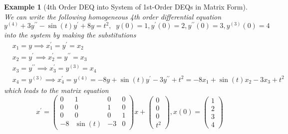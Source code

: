 \documentclass{article}
\newtheorem{example}{Example}[section]
\theoremstyle{remark}
\theoremstyle{definition}
\begin{document}
\begin{example}[4th Order DEQ into System of 1st-Order DEQs in Matrix Form]
We can write the following homogeneous 4th order differential equation 
\[y^{(4)} + 3 y^{\prime\prime} - \sin{(t)} y^\prime + 8y = t^2, \;\; y(0) = 1, y^\prime (0) = 2, y^{\prime\prime} (0) = 3, y^{(3)} (0) = 4 \]
into the system by making the substitutions 
\begin{align*}
    & x_1 = y \implies x_1^\prime = y^\prime = x_2 \\
    & x_2 = y^\prime \implies x_2^\prime = y^{\prime\prime} = x_3 \\
    & x_3 = y^{\prime\prime} \implies x_3^\prime = y^{(3)} = x_4 \\
    & x_4 = y^{(3)} \implies x_4^\prime = y^{(4)} = -8y + \sin{(t)} y^\prime - 3y^{\prime\prime} + t^2 = -8x_1 + \sin{(t)} x_2 - 3x_3 + t^2
\end{align*}
which leads to the matrix equation
\[x^\prime =  \begin{pmatrix} 
0&1&0&0\\
0&0&1&0\\
0&0&0&1\\
-8&\sin(t)&-3&0
\end{pmatrix} x
+ \begin{pmatrix} 
0\\0\\0\\t^2
\end{pmatrix}, x (0) = \begin{pmatrix} 
1\\2\\3\\4
\end{pmatrix}\]
\end{example}
\end{document}

